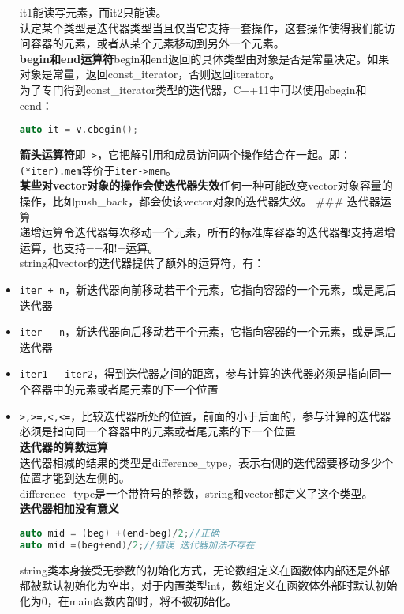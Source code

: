 \documentclass[
  a4paper,
  oneside,tablecaptionabove
]{scrbook}
\begin{document}
\begin{itemize}
  it1能读写元素，而it2只能读。\\
  认定某个类型是迭代器类型当且仅当它支持一套操作，这套操作使得我们能访问容器的元素，或者从某个元素移动到另外一个元素。\\
  \textbf{begin和end运算符}begin和end返回的具体类型由对象是否是常量决定。如果对象是常量，返回const\_iterator，否则返回iterator。\\
  为了专门得到const\_iterator类型的迭代器，C++11中可以使用cbegin和cend：

\begin{lstlisting}[language={C++}]
auto it = v.cbegin();
\end{lstlisting}

  \textbf{箭头运算符}即\lstinline!->!，它把解引用和成员访问两个操作结合在一起。即：\lstinline!(*iter).mem!等价于\lstinline!iter->mem!。\\
  \textbf{某些对vector对象的操作会使迭代器失效}任何一种可能改变vector对象容量的操作，比如push\_back，都会使该vector对象的迭代器失效。
  \#\#\# 迭代器运算\\
  递增运算令迭代器每次移动一个元素，所有的标准库容器的迭代器都支持递增运算，也支持==和!=运算。\\
  string和vector的迭代器提供了额外的运算符，有：\\
\item
  \lstinline!iter + n!，新迭代器向前移动若干个元素，它指向容器的一个元素，或是尾后迭代器\\
\item
  \lstinline!iter - n!，新迭代器向后移动若干个元素，它指向容器的一个元素，或是尾后迭代器\\
\item
  \lstinline!iter1 - iter2!，得到迭代器之间的距离，参与计算的迭代器必须是指向同一个容器中的元素或者尾元素的下一个位置\\
\item
  \lstinline!>,>=,<,<=!，比较迭代器所处的位置，前面的小于后面的，参与计算的迭代器必须是指向同一个容器中的元素或者尾元素的下一个位置\\
  \textbf{迭代器的算数运算}\\
  迭代器相减的结果的类型是difference\_type，表示右侧的迭代器要移动多少个位置才能到达左侧的。\\
  difference\_type是一个带符号的整数，string和vector都定义了这个类型。\\
  \textbf{迭代器相加没有意义}

\begin{lstlisting}[language={C++}]
auto mid = (beg) +(end-beg)/2;//正确
auto mid =(beg+end)/2;//错误 迭代器加法不存在
\end{lstlisting}

  string类本身接受无参数的初始化方式，无论数组定义在函数体内部还是外部都被默认初始化为空串，对于内置类型int，数组定义在函数体外部时默认初始化为0，在main函数内部时，将不被初始化。
\end{itemize}
\end{document}
